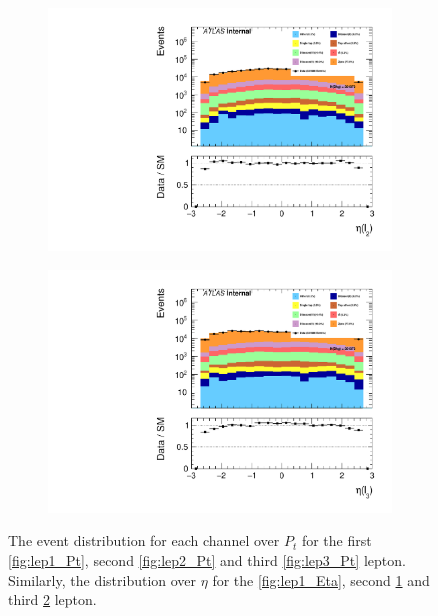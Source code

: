 \begin{figure}
{\begin{subfigure}{.425\textwidth}
        \includegraphics[width=\textwidth]{Figures/FeaturesHistograms/lep2_Eta.pdf}
        \caption{}
        \label{fig:lep2_Eta}
    \end{subfigure}
    \hfill
    \begin{subfigure}{.425\textwidth}
        \includegraphics[width=\textwidth]{Figures/FeaturesHistograms/lep3_Eta.pdf}
        \caption{}
        \label{fig:lep3_Eta}
    \end{subfigure}
    }
    \caption{The event distribution for each channel over $P_t$ for the first \ref{fig:lep1_Pt}, 
    second \ref{fig:lep2_Pt} and third \ref{fig:lep3_Pt} lepton. Similarly, the distribution over $\eta$
    for the \ref{fig:lep1_Eta}, second \ref{fig:lep2_Eta} and third \ref{fig:lep3_Eta} lepton.}
    \label{fig:Dist1}
\end{figure}
